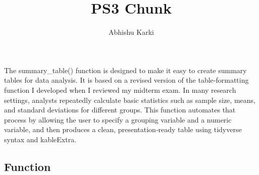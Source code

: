 \documentclass[
  letterpaper,
  DIV=11,
  numbers=noendperiod]{scrartcl}
\title{PS3 Chunk}
\author{Abhishu Karki}
\date{}
\begin{document}
\maketitle


The summary\_table() function is designed to make it easy to create
summary tables for data analysis. It is based on a revised version of
the table‑formatting function I developed when I reviewed my midterm
exam. In many research settings, analysts repeatedly calculate basic
statistics such as sample size, means, and standard deviations for
different groups. This function automates that process by allowing the
user to specify a grouping variable and a numeric variable, and then
produces a clean, presentation‑ready table using tidyverse syntax and
kableExtra.

\subsection{Function}\label{function}
\end{document}
